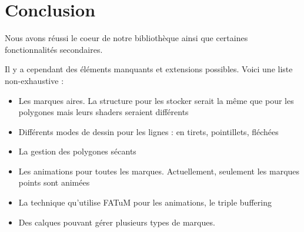 \documentclass[12pt]{article}
\begin{document}
\section{Conclusion}

Nous avons réussi le coeur de notre bibliothèque ainsi que certaines fonctionnalités
secondaires.

Il y a cependant des éléments manquants et extensions possibles.
Voici une liste non-exhaustive :

\begin{itemize}
\item Les marques aires. La structure pour les stocker serait la même que pour les
polygones mais leurs shaders seraient différents
\item Différents modes de dessin pour les lignes : en tirets, pointillets, fléchées
\item La gestion des polygones sécants
\item Les animations pour toutes les marques. Actuellement, seulement les marques points
sont animées
\item La technique qu'utilise FATuM pour les animations, le triple buffering
\item Des calques pouvant gérer plusieurs types de marques.
\end{itemize}

\printglossaries
\printbibliography
\end{document}
